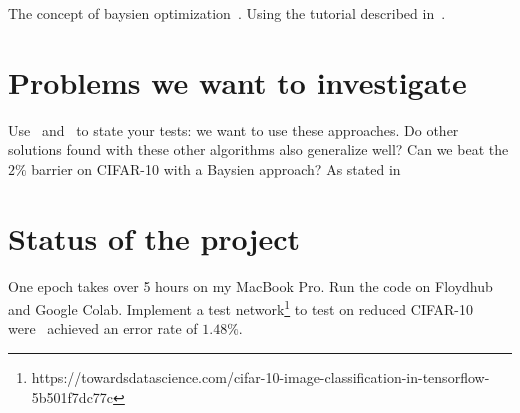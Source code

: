 \documentclass[10pt,twocolumn,letterpaper]{article}
\begin{document}
The concept of baysien optimization~\cite{DBLP:journals/corr/abs-1012-2599}. Using the tutorial described in~\cite{2018arXiv180702811F}.  

\section{Problems we want to investigate}
Use~\cite{2018arXiv180201548R} and~\cite{2018arXiv180307055M} to state your tests: we want to use these approaches. Do other solutions found with these other algorithms also generalize well? Can we beat the $2\%$ barrier on CIFAR-10 with a Baysien approach?
As stated in~\cite{Goodfellow-et-al-2016} 

\section{Status of the project}
One epoch takes over 5 hours on my MacBook Pro. Run the code on Floydhub and Google Colab. Implement a test network\footnote{https://towardsdatascience.com/cifar-10-image-classification-in-tensorflow-5b501f7dc77c} to test on reduced CIFAR-10 were~\cite{Ekin} achieved an error rate of $1.48\%$.

{\small


}
\end{document}
